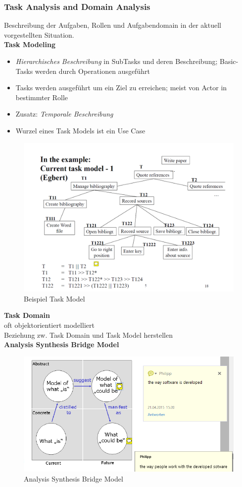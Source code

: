 \subsubsection{Task Analysis and Domain Analysis}
Beschreibung der Aufgaben, Rollen und Aufgabendomain in der aktuell vorgestellten Situation.\\
\textbf{Task Modeling}
\begin{itemize}
	\item \textit{Hierarchisches Beschreibung} in  SubTasks und deren Beschreibung; Basic-Tasks werden durch Operationen ausgeführt
	\item Tasks werden ausgeführt um ein Ziel zu erreichen; meist von Actor in bestimmter Rolle
	\item Zusatz: \textit{Temporale Beschreibung} 
	\item Wurzel eines Task Models ist ein Use Case
\end{itemize}
\begin{figure}[!h]
	\centering
	\includegraphics[scale=0.3]{img/task_model_ex.png}
	\caption{Beispiel Task Model}
\end{figure}
\textbf{Task Domain}\\
oft objektorientiert modelliert\\
Beziehung zw. Task Domain und Task Model herstellen \\


\newpage
\textbf{Analysis Synthesis Bridge Model}
\begin{figure}[!h]
	\centering
	\includegraphics[scale=0.6]{img/analysis_synthesis_bridge_model.png}
	\caption{Analysis Synthesis Bridge Model}
\end{figure}


